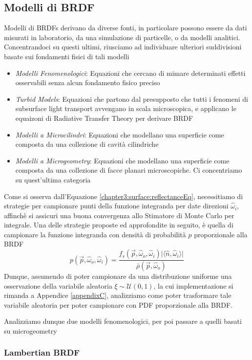\subsection{Modelli di BRDF}
Modelli di BRDFs derivano da diverse fonti, in particolare possono essere da dati misurati in laboratorio, da una simulazione di particelle, o da 
modelli analitici. Concentrandoci su questi ultimi, riusciamo ad individuare ulteriori suddivisioni basate sui fondamenti fisici di tali modelli
\begin{itemize}[topsep=0pt, noitemsep]
	\item \textit{Modelli Fenomenologici}: Equazioni che cercano di mimare determinati effetti osservabili senza alcun fondamento fisico preciso
	\item \textit{Turbid Models}: Equazioni che partono dal presupposto che tutti i fenomeni di subsurface light transport avvengano in scala
		microscopica, e applicano le equaizoni di Radiative Transfer Theory per derivare BRDF
	\item \textit{Modelli a Microcilindri}: Equazioni che modellano una superficie come composta da una collezione di cavit\`a cilindriche
	\item \textit{Modelli a Microgeometry}: Equazioni che modellano una superficie come composta da una collezione di facce planari microscopiche.
		Ci concentriamo su quest'ultima categoria
\end{itemize}
Come si osserva dall'Equazione \ref{chapter3:surface:reflectanceEq}, necessitiamo di strategie per campionare punti della funzione integranda per 
date direzioni $\hat{\omega}_i$, affinch\`e si assicuri una buona convergenza allo Stimatore di Monte Carlo per integrale. Una delle strategie proposte
ed approfondite in seguito, \`e quella di campionare la funzione integranda con densit\`a di probabilit\`a $p$ proporzionale alla BRDF
\begin{equation}
	p(\vec{p},\hat{\omega}_o,\hat{\omega}_i) = \frac{f_s(\vec{p},\hat{\omega}_o,\hat{\omega}_i)\vert\langle\hat{n},\hat{\omega}_i\rangle\vert}%
		{\bar{\rho}(\vec{p},\hat{\omega}_o)}
\end{equation}
Dunque, assumendo di poter campionare da una distribuzione uniforme una osservazione della variabile aleatoria $\xi\sim\mathcal{U}(0,1)$, la cui 
implementazione si rimanda a Appendice \ref{appendixC}, analizziamo come poter trasformare tale variabile aleatoria per poter campionare con PDF 
proporzionale alla BRDF.\par
Analizziamo dunque due modelli fenomenologici, per poi passare a quelli basati su microgeometry
\subsubsection{Lambertian BRDF}
